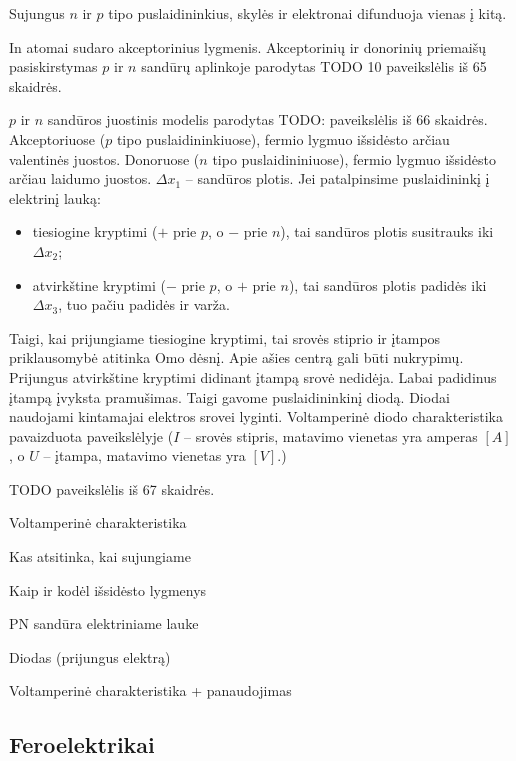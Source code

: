 Sujungus $n$ ir $p$ tipo puslaidininkius, skylės ir elektronai
difunduoja vienas į kitą.

In atomai sudaro akceptorinius lygmenis. Akceptorinių ir donorinių
priemaišų pasiskirstymas $p$ ir $n$ sandūrų aplinkoje
parodytas TODO 10 paveikslėlis iš 65 skaidrės.

$p$ ir $n$ sandūros juostinis modelis parodytas TODO: paveikslėlis
iš 66 skaidrės.
Akceptoriuose ($p$ tipo puslaidininkiuose), fermio lygmuo išsidėsto
arčiau valentinės juostos. Donoruose ($n$ tipo puslaidininiuose),
fermio lygmuo išsidėsto arčiau laidumo juostos. $\Delta x_{1}$ –
sandūros plotis. Jei patalpinsime puslaidininkį į elektrinį
lauką:
\begin{itemize}
  \item tiesiogine kryptimi ($+$ prie $p$, o $-$ prie $n$), tai
    sandūros plotis susitrauks iki $\Delta x_{2}$;
  \item atvirkštine kryptimi ($-$ prie $p$, o $+$ prie $n$),
    tai sandūros plotis padidės iki $\Delta x_{3}$, tuo pačiu
    padidės ir varža.
\end{itemize}
Taigi, kai prijungiame tiesiogine kryptimi, tai srovės stiprio ir
įtampos priklausomybė atitinka Omo dėsnį. Apie ašies centrą gali
būti nukrypimų. Prijungus atvirkštine kryptimi didinant įtampą
srovė nedidėja. Labai padidinus įtampą įvyksta pramušimas.
Taigi gavome puslaidininkinį diodą. Diodai naudojami kintamajai
elektros srovei lyginti. Voltamperinė diodo charakteristika
pavaizduota  paveikslėlyje ($I$ – srovės stipris,
matavimo vienetas yra amperas $[A]$, o $U$ – įtampa, matavimo vienetas
yra $[V]$.)

TODO paveikslėlis iš 67 skaidrės.

{Voltamperinė charakteristika}

\begin{remember}
  \item Kas atsitinka, kai sujungiame
  \item Kaip ir kodėl išsidėsto lygmenys
  \item PN sandūra elektriniame lauke
  \item Diodas (prijungus elektrą)
  \item Voltamperinė charakteristika + panaudojimas
\end{remember}

\subsection{Feroelektrikai}


